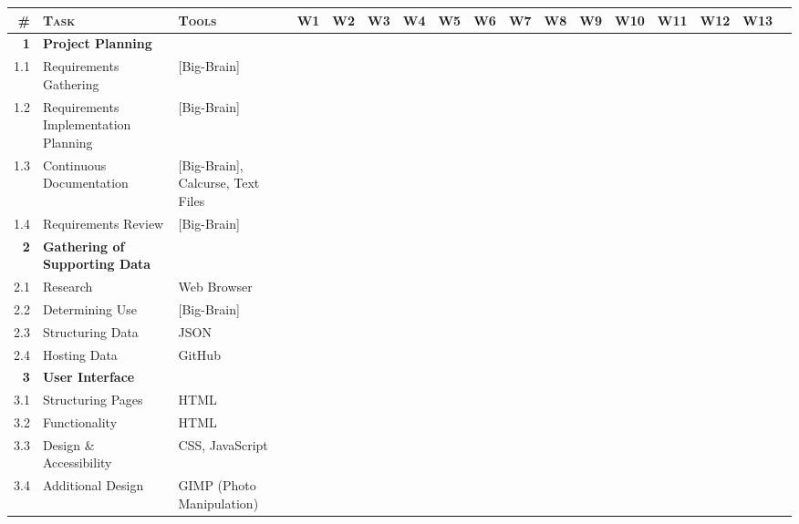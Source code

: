 \documentclass[11pt, english]{article}
\begin{document}
\begin{landscape}

        \begin{table}[h]
                \tiny
                \renewcommand{\arraystretch}{1.25}
        \begin{center}
        \begin{tabular}{rll|cccccccccccccc}
                \textsc{\#} & \textsc{Task} & \textsc{Tools} & \textsc{W1} & \textsc{W2} & \textsc{W3} & \textsc{W4} & \textsc{W5} & \textsc{W6} & \textsc{W7} & \textsc{W8} & \textsc{W9} & \textsc{W10} & \textsc{W11} & \textsc{W12} & \textsc{W13}\\
                \hline
                \textbf{1} & \textbf{Project Planning} &\\
		1.1 & Requirements Gathering & [Big-Brain] & \cellcolor{gray}\\
		1.2 & Requirements Implementation Planning & [Big-Brain] & \cellcolor{gray}\\
		1.3 & Continuous Documentation & [Big-Brain], Calcurse, Text Files & \cellcolor{gray} & \cellcolor{gray} & \cellcolor{gray} & \cellcolor{gray} & \cellcolor{gray} & \cellcolor{gray} & \cellcolor{gray} & \cellcolor{gray} & \cellcolor{gray}\\
		1.4 & Requirements Review & [Big-Brain] & & \cellcolor{gray}\\
                \hline
		\textbf{2} & \textbf{Gathering of Supporting Data} &\\
		2.1 & Research & Web Browser & & \cellcolor{gray}\\
		2.2 & Determining Use & [Big-Brain] & & \cellcolor{gray}\\
		2.3 & Structuring Data & JSON & & \cellcolor{gray} & \cellcolor{gray}\\
		2.4 & Hosting Data & GitHub & & \cellcolor{gray} & \cellcolor{gray}\\
		\hline
                \textbf{3} & \textbf{User Interface} &\\
		3.1 & Structuring Pages & HTML & & \cellcolor{gray} & \cellcolor{gray}\\
		3.2 & Functionality & HTML & & \cellcolor{gray} & \cellcolor{gray} & \cellcolor{gray} & \cellcolor{gray}\\
		3.3 & Design \& Accessibility & CSS, JavaScript & & & & & & \cellcolor{gray} & \cellcolor{gray}\\
		3.4 & Additional Design & GIMP (Photo Manipulation) & & & & & & \cellcolor{gray} & \cellcolor{gray}\\

\end{tabular}
\end{center}
\end{table}
\end{landscape}
\end{document}
